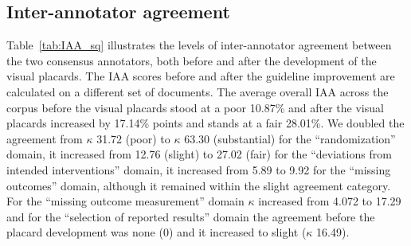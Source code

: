 \documentclass[sn-mathphys,Numbered]{sn-jnl}%
\theoremstyle{thmstyleone}%
\theoremstyle{thmstyletwo}%
\theoremstyle{thmstylethree}%
\begin{document}
%
%
%
\subsection{Inter-annotator agreement}
\label{result:iaa}
%
Table~\ref{tab:IAA_sq} illustrates the levels of inter-annotator agreement between the two consensus annotators, both before and after the development of the visual placards.
The IAA scores before and after the guideline improvement are calculated on a different set of documents.
The average overall IAA across the corpus before the visual placards stood at a poor 10.87\% and after the visual placards increased by 17.14\% points and stands at a fair 28.01\%.
We doubled the agreement from $\kappa$ 31.72 (poor) to $\kappa$ 63.30 (substantial) for the ``randomization'' domain, it increased from 12.76 (slight) to 27.02 (fair) for the ``deviations from intended interventions'' domain, it increased from 5.89 to 9.92 for the ``missing outcomes'' domain, although it remained within the slight agreement category.
For the ``missing outcome measurement'' domain $\kappa$ increased from 4.072 to 17.29 and for the ``selection of reported results'' domain the agreement before the placard development was none (0) and it increased to slight ($\kappa$ 16.49).
\end{document}
